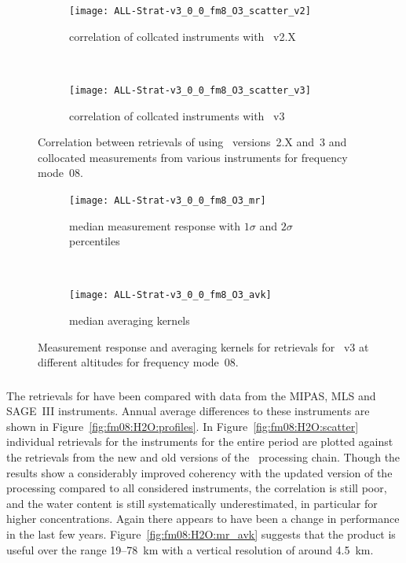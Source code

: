 \begin{figure}[tbhp]
    \centering
    \begin{subfigure}[b]{0.49\textwidth}
        \texttt{[image: ALL-Strat-v3\_0\_0\_fm8\_O3\_scatter\_v2]}
        \caption{correlation of collcated instruments with \smr~v2.X}
        \label{fig:fm08:O3:scatter:v2}
    \end{subfigure}
    \,
    \begin{subfigure}[b]{0.49\textwidth}
        \texttt{[image: ALL-Strat-v3\_0\_0\_fm8\_O3\_scatter\_v3]}
        \caption{correlation of collcated instruments with \smr~v3}
        \label{fig:fm08:O3:scatter:v3}
    \end{subfigure}
    \caption{Correlation between retrievals of  using \smr\
    versions~2.X and~3 and collocated measurements from various instruments
    for frequency mode~08.}
    \label{fig:fm08:O3:scatter}
\end{figure}

\begin{figure}[tbhp]
    \centering
    \begin{subfigure}[b]{0.49\textwidth}
        \texttt{[image: ALL-Strat-v3\_0\_0\_fm8\_O3\_mr]}
        \caption{median measurement response with $1\sigma$ and $2\sigma$
        percentiles}
        \label{fig:fm08:O3:mr}
    \end{subfigure}
    \,
    \begin{subfigure}[b]{0.49\textwidth}
        \texttt{[image: ALL-Strat-v3\_0\_0\_fm8\_O3\_avk]}
        \caption{median averaging kernels\newline~}
        \label{fig:fm08:O3:avk}
    \end{subfigure}
    \caption{Measurement response and averaging kernels for 
    retrievals for \smr~v3 at different altitudes for frequency mode~08.}
    \label{fig:fm08:O3:mr_avk}
\end{figure}



\subsubsection{}
\label{sec:fm08:comparison:H2O}
The retrievals for \chem{H_2O} have been compared with data from the MIPAS,
MLS and SAGE~III instruments. Annual average differences to these instruments
are shown in Figure~\ref{fig:fm08:H2O:profiles}. In
Figure~\ref{fig:fm08:H2O:scatter} individual retrievals for the instruments for
the entire period are plotted against the retrievals from the new and old
versions of the \smr\ processing chain. Though the results show a considerably
improved coherency with the updated version of the processing compared to all
considered instruments, the correlation is still poor, and the water content is
still systematically underestimated, in particular for higher concentrations. Again there
appears to have been a change in performance in the last few years.
Figure~\ref{fig:fm08:H2O:mr_avk} suggests that the product is useful over the
range 19--78~km with a vertical resolution of around 4.5~km.

